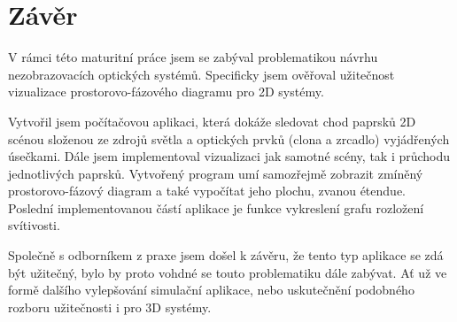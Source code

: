 \chapter{Závěr}

V rámci této maturitní práce jsem se zabýval problematikou návrhu nezobrazovacích optických systémů. Specificky jsem ověřoval užitečnost vizualizace prostorovo-fázového diagramu pro 2D systémy.

Vytvořil jsem počítačovou aplikaci, která dokáže sledovat chod paprsků 2D scénou složenou ze zdrojů světla a optických prvků (clona a zrcadlo) vyjádřených úsečkami. Dále jsem implementoval vizualizaci jak samotné scény, tak i průchodu jednotlivých paprsků. Vytvořený program umí samozřejmě zobrazit zmíněný prostorovo-fázový diagram a také vypočítat jeho plochu, zvanou étendue. Poslední implementovanou částí aplikace je funkce vykreslení grafu rozložení svítivosti.

Společně s odborníkem z praxe jsem došel k závěru, že tento typ aplikace se zdá být užitečný, bylo by proto vohdné se touto problematiku dále zabývat. Ať už ve formě dalšího vylepšování simulační aplikace, nebo uskutečnění podobného rozboru užitečnosti i pro 3D systémy.
